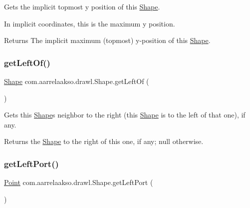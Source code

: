 Gets the implicit topmost y position of this \hyperlink{classcom_1_1aarrelaakso_1_1drawl_1_1_shape}{Shape}. 

In implicit coordinates, this is the maximum y position.

\begin{DoxyReturn}{Returns}
The implicit maximum (topmost) y-\/position of this \hyperlink{classcom_1_1aarrelaakso_1_1drawl_1_1_shape}{Shape}. 
\end{DoxyReturn}
\mbox{\label{classcom_1_1aarrelaakso_1_1drawl_1_1_shape_a2b19d5964ac46d545a7bae3133df6532}} 
\subsubsection{\texorpdfstring{get\+Left\+Of()}{getLeftOf()}}
{\footnotesize\ttfamily \hyperlink{classcom_1_1aarrelaakso_1_1drawl_1_1_shape}{Shape} com.\+aarrelaakso.\+drawl.\+Shape.\+get\+Left\+Of (\begin{DoxyParamCaption}{ }\end{DoxyParamCaption})\hspace{0.3cm}{\ttfamily [inherited]}}



Gets this \hyperlink{classcom_1_1aarrelaakso_1_1drawl_1_1_shape}{Shape}\textquotesingle{}s neighbor to the right (this \hyperlink{classcom_1_1aarrelaakso_1_1drawl_1_1_shape}{Shape} is to the left of that one), if any. 

\begin{DoxyReturn}{Returns}
the \hyperlink{classcom_1_1aarrelaakso_1_1drawl_1_1_shape}{Shape} to the right of this one, if any; {\ttfamily null} otherwise. 
\end{DoxyReturn}
\mbox{\label{classcom_1_1aarrelaakso_1_1drawl_1_1_shape_aeffa96786ca552adf46924ec77da9555}} 
\subsubsection{\texorpdfstring{get\+Left\+Port()}{getLeftPort()}}
{\footnotesize\ttfamily \hyperlink{classcom_1_1aarrelaakso_1_1drawl_1_1_point}{Point} com.\+aarrelaakso.\+drawl.\+Shape.\+get\+Left\+Port (\begin{DoxyParamCaption}{ }\end{DoxyParamCaption})\hspace{0.3cm}{\ttfamily [inherited]}}



